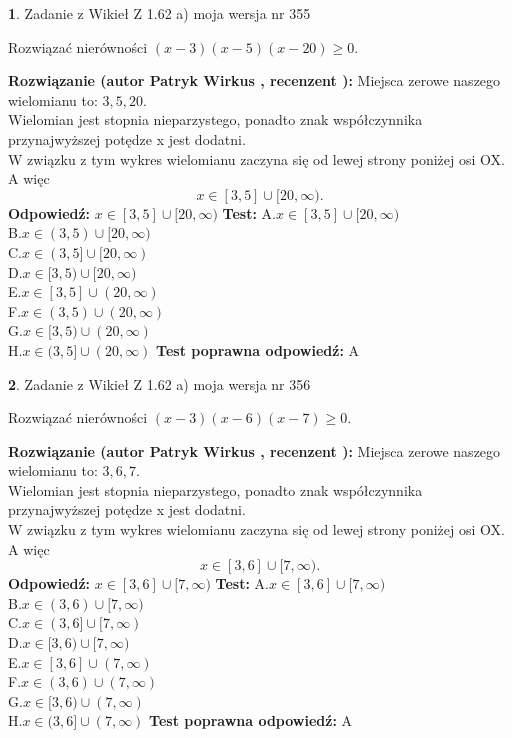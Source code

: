 \documentclass[12pt, a4paper]{article}
\theoremstyle{definition} %
\newtheorem{zad}{}
\newcommand{\zadStart}[1]{\begin{zad}#1\newline}
\newcommand{\zadStop}{\end{zad}}
\newcommand{\rozwStart}[2]{\noindent \textbf{Rozwiązanie (autor #1 , recenzent #2): }\newline}
\newcommand{\rozwStop}{\newline}
\newcommand{\odpStart}{\noindent \textbf{Odpowiedź:}\newline}
\newcommand{\odpStop}{\newline}
\newcommand{\testStart}{\noindent \textbf{Test:}\newline}
\newcommand{\testStop}{\newline}
\newcommand{\kluczStart}{\noindent \textbf{Test poprawna odpowiedź:}\newline}
\newcommand{\kluczStop}{\newline}
\begin{document}
\zadStart{Zadanie z Wikieł Z 1.62 a) moja wersja nr 355}

Rozwiązać nierówności $(x-3)(x-5)(x-20)\ge0$.
\zadStop
\rozwStart{Patryk Wirkus}{}
Miejsca zerowe naszego wielomianu to: $3, 5, 20$.\\
Wielomian jest stopnia nieparzystego, ponadto znak współczynnika przy\linebreak najwyższej potędze x jest dodatni.\\ W związku z tym wykres wielomianu zaczyna się od lewej strony poniżej osi OX. A więc $$x \in [3,5] \cup [20,\infty).$$
\rozwStop
\odpStart
$x \in [3,5] \cup [20,\infty)$
\odpStop
\testStart
A.$x \in [3,5] \cup [20,\infty)$\\
B.$x \in (3,5) \cup [20,\infty)$\\
C.$x \in (3,5] \cup [20,\infty)$\\
D.$x \in [3,5) \cup [20,\infty)$\\
E.$x \in [3,5] \cup (20,\infty)$\\
F.$x \in (3,5) \cup (20,\infty)$\\
G.$x \in [3,5) \cup (20,\infty)$\\
H.$x \in (3,5] \cup (20,\infty)$
\testStop
\kluczStart
A
\kluczStop



\zadStart{Zadanie z Wikieł Z 1.62 a) moja wersja nr 356}

Rozwiązać nierówności $(x-3)(x-6)(x-7)\ge0$.
\zadStop
\rozwStart{Patryk Wirkus}{}
Miejsca zerowe naszego wielomianu to: $3, 6, 7$.\\
Wielomian jest stopnia nieparzystego, ponadto znak współczynnika przy\linebreak najwyższej potędze x jest dodatni.\\ W związku z tym wykres wielomianu zaczyna się od lewej strony poniżej osi OX. A więc $$x \in [3,6] \cup [7,\infty).$$
\rozwStop
\odpStart
$x \in [3,6] \cup [7,\infty)$
\odpStop
\testStart
A.$x \in [3,6] \cup [7,\infty)$\\
B.$x \in (3,6) \cup [7,\infty)$\\
C.$x \in (3,6] \cup [7,\infty)$\\
D.$x \in [3,6) \cup [7,\infty)$\\
E.$x \in [3,6] \cup (7,\infty)$\\
F.$x \in (3,6) \cup (7,\infty)$\\
G.$x \in [3,6) \cup (7,\infty)$\\
H.$x \in (3,6] \cup (7,\infty)$
\testStop
\kluczStart
A
\kluczStop
\end{document}
